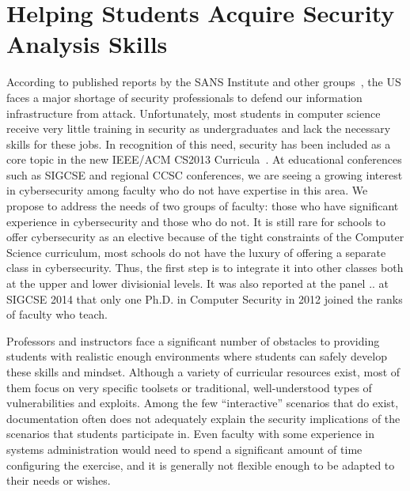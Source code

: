 

%


\section{Helping Students Acquire Security Analysis Skills}
\label{sec:intro}

According to published reports by the SANS Institute and other 
groups~\cite{defensenewsshortage}, the US faces a major shortage of 
security professionals to defend our information infrastructure from
attack.  Unfortunately, most students 
in computer science receive very little training in security as
undergraduates and lack the necessary skills 
for these jobs.  In recognition of this need, security has been included as
a core topic in the new 
IEEE/ACM CS2013 Curricula~\cite{acmcurriculum}.   At educational conferences such
as SIGCSE and regional CCSC conferences, we are seeing a growing interest 
in cybersecurity among faculty who do not have expertise in this area.
We propose to address the needs of two groups of faculty: those who have
significant experience in cybersecurity and those who do not.
It is still
rare for schools to offer cybersecurity as an elective
because of the tight 
constraints of the Computer Science curriculum, most schools 
do not have the luxury of offering a separate class in cybersecurity.  Thus, 
the first step is to integrate it into other classes both at the upper and lower divisionial
levels.  It was also reported at the panel .. at SIGCSE 2014 that only one Ph.D. in Computer
Security in 2012 joined the ranks of faculty who teach.

 Professors and instructors face a significant number of
obstacles to providing students with realistic enough environments
where students can safely develop these skills and mindset.  Although
a variety of curricular resources exist, most of them focus on very specific
toolsets or traditional, well-understood types of vulnerabilities and
exploits.  Among the few ``interactive'' scenarios that do exist, documentation
 often  does not adequately explain the
security implications of the scenarios that students participate in.  Even faculty
with some experience in systems administration would need to 
spend a significant amount of time configuring the exercise, and it is 
generally not flexible enough to be adapted to their needs or wishes.



